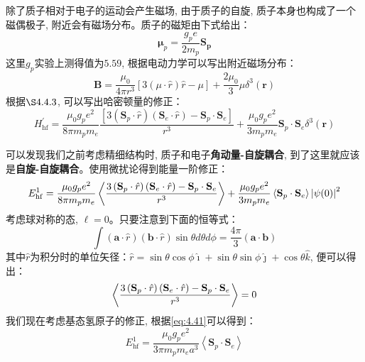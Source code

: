 \documentclass[a4paper,zihao=-4,linespread=1]{ctexrep}
\begin{document}
    除了质子相对于电子的运动会产生磁场, 由于质子的自旋, 质子本身也构成了一个磁偶极子, 附近会有磁场分布。质子的磁矩由下式给出：
    $$\mathbf{\mu}_p=\frac{g_p e}{2m_p}\mathbf{S_p}$$
    这里$g_p$实验上测得值为$5.59$, 根据电动力学可以写出附近磁场分布：
    \begin{equation}
        \mathbf{B}=\frac{\mu_0}{4 \pi r^3}[3(\mu \cdot \hat{r}) \hat{r}-\mu]+\frac{2 \mu_0}{3} \mu \delta^3(\mathbf{r})
    \end{equation}
    根据$\S4.4.3$, 可以写出哈密顿量的修正：
    \begin{equation}
        H_{\mathrm{hf}}^{\prime}=\frac{\mu_0 g_p e^2}{8 \pi m_p m_e} \frac{\left[3\left(\mathbf{S}_p \cdot \hat{r}\right)\left(\mathbf{S}_e \cdot \hat{r}\right)-\mathbf{S}_p \cdot \mathbf{S}_e\right]}{r^3}+\frac{\mu_0 g_p e^2}{3 m_p m_e} \mathbf{S}_p \cdot \mathbf{S}_e \delta^3(\mathbf{r})
    \end{equation}
    
    可以发现我们之前考虑精细结构时, 质子和电子\textbf{角动量-自旋耦合}, 到了这里就应该是\textbf{自旋-自旋耦合}。使用微扰论得到能量一阶修正：
    \begin{equation}
        E^1_{\mathrm{hf}}=\frac{\mu_0 g_p e^2}{8 \pi m_p m_e} \Braket{\frac{3\left(\mathbf{S}_p \cdot \hat{r}\right)\left(\mathbf{S}_e \cdot \hat{r}\right)-\mathbf{S}_p \cdot \mathbf{S}_e}{r^3}}+\frac{\mu_0 g_p e^2}{3 m_p m_e} \Braket{\mathbf{S}_p \cdot \mathbf{S}_e} \left|\psi(0)\right|^2
    \end{equation}
    考虑球对称的态, $\ell=0$。只要注意到下面的恒等式：
    \begin{equation}
        \int(\mathbf{a} \cdot \hat{r})(\mathbf{b} \cdot \hat{r}) \sin \theta d \theta d \phi=\frac{4 \pi}{3}(\mathbf{a} \cdot \mathbf{b})
    \end{equation}
    其中$\hat{r}$为积分时的单位矢径：$\hat{r}=\sin \theta \cos \phi \hat{\imath}+\sin \theta \sin \phi \hat{\jmath}+\cos \theta \hat{k}$, 便可以得出：
    $$\Braket{\frac{3\left(\mathbf{S}_p \cdot \hat{r}\right)\left(\mathbf{S}_e \cdot \hat{r}\right)-\mathbf{S}_p \cdot \mathbf{S}_e}{r^3}}=0$$
    我们现在考虑基态氢原子的修正, 根据\ref{eq:4.41}可以得到：
    \begin{equation}
        E_{\mathrm{hf}}^{1}=\frac{\mu_{0} g_{p} e^{2}}{3 \pi m_{p} m_{e} a^{3}}\left\langle\mathbf{S}_{p} \cdot \mathbf{S}_{e}\right\rangle
    \end{equation}
    
\end{document}
